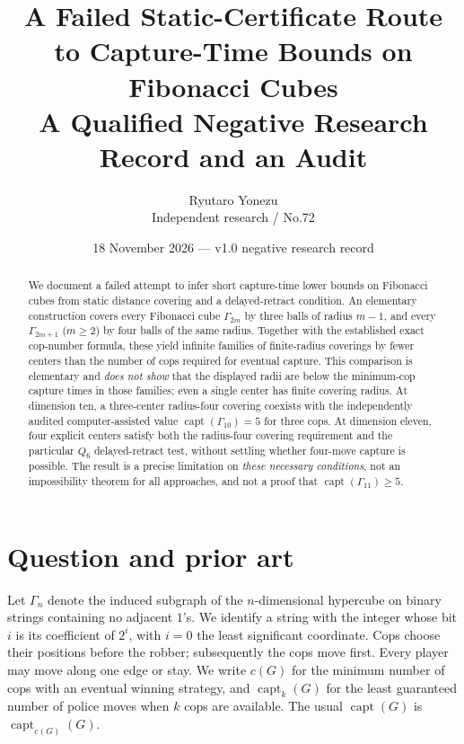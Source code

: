 \documentclass[10pt]{article}
\title{A Failed Static-Certificate Route to Capture-Time Bounds on Fibonacci Cubes\\[3pt]
\large A Qualified Negative Research Record and an Audit}
\author{Ryutaro Yonezu\\\small Independent research / No.72}
\date{18 November 2026 --- v1.0 negative research record}
\newcommand{\Ga}{\Gamma}
\newcommand{\capt}{\operatorname{capt}}
\begin{document}
\maketitle
\begin{center}
\end{center}
\begin{abstract}
We document a failed attempt to infer short capture-time lower bounds on Fibonacci
cubes from static distance covering and a delayed-retract condition.
An elementary construction covers every Fibonacci cube $\Ga_{2m}$ by three
balls of radius $m-1$, and every $\Ga_{2m+1}$ ($m\ge2$) by four balls
of the same radius. Together with the established exact cop-number formula, these yield
infinite families of finite-radius coverings by fewer centers than the number
of cops required for eventual capture. This comparison is elementary and
\emph{does not show} that the displayed radii are below the minimum-cop
capture times in those families; even a single center has finite covering
radius. At dimension ten, a three-center radius-four covering coexists with the independently
audited computer-assisted value $\capt(\Ga_{10})=5$ for three cops.
At dimension eleven, four explicit centers satisfy both the radius-four
covering requirement and the particular $Q_6$ delayed-retract test, without
settling whether four-move capture is possible.
The result is a precise limitation on \emph{these necessary conditions}, not an
impossibility theorem for all approaches, and not a proof that
$\capt(\Ga_{11})\ge5$.
\end{abstract}

\section{Question and prior art}
Let $\Ga_n$ denote the induced subgraph of the $n$-dimensional hypercube
on binary strings containing no adjacent $1$'s. We identify a string with
the integer whose bit $i$ is its coefficient of $2^i$, with $i=0$ the
least significant coordinate. Cops choose their positions before the robber;
subsequently the cops move first. Every player may move along one edge or stay.
We write $c(G)$ for the minimum number of cops with an eventual winning strategy,
and $\capt_k(G)$ for the least guaranteed number of police moves when $k$ cops
are available. The usual $\capt(G)$ is $\capt_{c(G)}(G)$.
\end{document}
